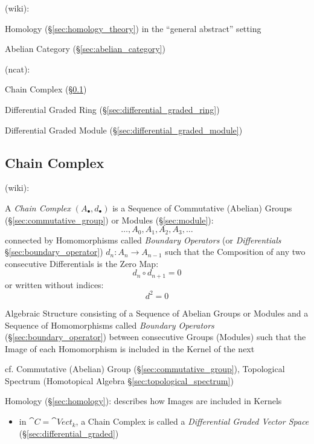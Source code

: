(wiki):

Homology (\S\ref{sec:homology_theory}) in the ``general abstract'' setting

Abelian Category (\S\ref{sec:abelian_category})

(ncat):

Chain Complex (\S\ref{sec:chain_complex})

Differential Graded Ring (\S\ref{sec:differential_graded_ring})

Differential Graded Module (\S\ref{sec:differential_graded_module})



\subsection{Chain Complex}\label{sec:chain_complex}

(wiki):

A \emph{Chain Complex} $(A_\bullet, d_\bullet)$ is a Sequence of Commutative
(Abelian) Groups (\S\ref{sec:commutative_group}) or Modules
(\S\ref{sec:module}):
\[
  \ldots, A_0, A_1, A_2, A_3, \ldots
\]
connected by Homomorphisms called \emph{Boundary Operators} (or
\emph{Differentials} \S\ref{sec:boundary_operator}) $d_n : A_n \rightarrow
A_{n-1}$ such that the Composition of any two consecutive Differentials is
the Zero Map:
\[
  d_n \circ d_{n+1} = 0
\]
or written without indices:
\[
  d^2 = 0
\]

Algebraic Structure consisting of a Sequence of Abelian Groups or Modules and a
Sequence of Homomorphisms called \emph{Boundary Operators}
(\S\ref{sec:boundary_operator}) between consecutive Groups (Modules) such that
the Image of each Homomorphism is included in the Kernel of the next

\fist cf. Commutative (Abelian) Group (\S\ref{sec:commutative_group}),
Topological Spectrum (Homotopical Algebra \S\ref{sec:topological_spectrum})

\fist Homology (\S\ref{sec:homology}): describes how Images are included in
Kernels

\begin{itemize}
  \item in $\cat{C} = \cat{Vect}_k$, a Chain Complex is called a
    \emph{Differential Graded Vector Space} (\S\ref{sec:differential_graded})
\end{itemize}


